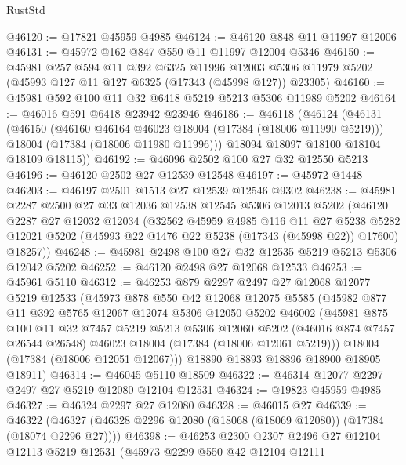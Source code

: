\begin{lexlean}{RustStd}
\begin{coremodule}
@46120 := @17821 @45959 @4985
@46124 := @46120 @848 @11 @11997 @12006
@46131 := @45972 @162 @847 @550 @11 @11997 @12004 @5346
@46150 := @45981
    @257
    @594
    @11
    @392
    @6325
    @11996
    @12003
    @5306
    @11979
    @5202
    (@45993 @127 @11 @127 @6325 (@17343 (@45998 @127)) @23305)
@46160 := @45981 @592 @100 @11 @32 @6418 @5219 @5213 @5306 @11989 @5202
@46164 := @46016 @591 @6418 @23942 @23946
@46186 := @46118
    (@46124
      (@46131
        (@46150
          (@46160 @46164 @46023 @18004 (@17384 (@18006 @11990 @5219)))
          @18004
          (@17384 (@18006 @11980 @11996)))
        @18094
        @18097
        @18100
        @18104
        @18109
        @18115))
@46192 := @46096 @2502 @100 @27 @32 @12550 @5213
@46196 := @46120 @2502 @27 @12539 @12548
@46197 := @45972 @1448
@46203 := @46197 @2501 @1513 @27 @12539 @12546 @9302
@46238 := @45981
    @2287
    @2500
    @27
    @33
    @12036
    @12538
    @12545
    @5306
    @12013
    @5202
    (@46120
      @2287
      @27
      @12032
      @12034
      (@32562
        @45959
        @4985
        @116
        @11
        @27
        @5238
        @5282
        @12021
        @5202
        (@45993 @22 @1476 @22 @5238 (@17343 (@45998 @22)) @17600)
        @18257))
@46248 := @45981 @2498 @100 @27 @32 @12535 @5219 @5213 @5306 @12042 @5202
@46252 := @46120 @2498 @27 @12068 @12533
@46253 := @45961 @5110
@46312 := @46253
    @879
    @2297
    @2497
    @27
    @12068
    @12077
    @5219
    @12533
    (@45973
      @878
      @550
      @42
      @12068
      @12075
      @5585
      (@45982
        @877
        @11
        @392
        @5765
        @12067
        @12074
        @5306
        @12050
        @5202
        @46002
        (@45981
          @875
          @100
          @11
          @32
          @7457
          @5219
          @5213
          @5306
          @12060
          @5202
          (@46016 @874 @7457 @26544 @26548)
          @46023
          @18004
          (@17384 (@18006 @12061 @5219)))
        @18004
        (@17384 (@18006 @12051 @12067)))
      @18890
      @18893
      @18896
      @18900
      @18905
      @18911)
@46314 := @46045 @5110 @18509
@46322 := @46314 @12077 @2297 @2497 @27 @5219 @12080 @12104 @12531
@46324 := @19823 @45959 @4985
@46327 := @46324 @2297 @27 @12080
@46328 := @46015 @27
@46339 := @46322 (@46327 (@46328 @2296 @12080 (@18068 (@18069 @12080)) (@17384 (@18074 @2296 @27))))
@46398 := @46253
    @2300
    @2307
    @2496
    @27
    @12104
    @12113
    @5219
    @12531
    (@45973
      @2299
      @550
      @42
      @12104
      @12111

\end{coremodule}
\end{lexlean}

